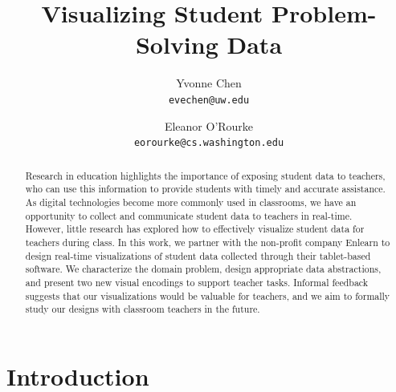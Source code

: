 \documentclass{sigchi}
\begin{document}
\author{
  Yvonne Chen\\
  \texttt{evechen@uw.edu}
  \and
  Eleanor O'Rourke\\
  \texttt{eorourke@cs.washington.edu}
}
\title{Visualizing Student Problem-Solving Data}


\maketitle

\begin{abstract}
Research in education highlights the importance of exposing student data to teachers, who can use this information to provide students with timely and accurate assistance. As digital technologies become more commonly used in classrooms, we have an opportunity to collect and communicate student data to teachers in real-time. However, little research has explored how to effectively visualize student data for teachers during class. In this work, we partner with the non-profit company Enlearn to design real-time visualizations of student data collected through their tablet-based software. We characterize the domain problem, design appropriate data abstractions, and present two new visual encodings to support teacher tasks. Informal feedback suggests that our visualizations would be valuable for teachers, and we aim to formally study our designs with classroom teachers in the future.

\end{abstract}




\section{Introduction}
\end{document}
